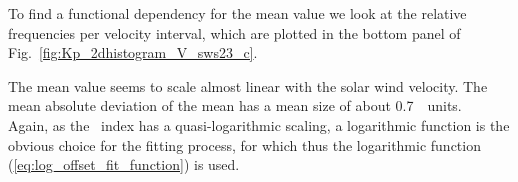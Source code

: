To find a functional dependency for the mean \Kp{} value we look at the relative frequencies per velocity interval, which are plotted in the bottom panel of Fig.~\ref{fig:Kp_2dhistogram_V_sws23_c}.
\begin{figure}
\end{figure}
The mean \Kp{} value seems to scale almost linear with the solar wind velocity. The mean absolute deviation of the mean has a mean size of about \SI{0.7}{\Kp~units}.\\

Again, as the \Kp~index has a quasi-logarithmic scaling, a logarithmic function is the obvious choice for the fitting process, for which thus the logarithmic function (\ref{eq:log_offset_fit_function}) is used.\\

